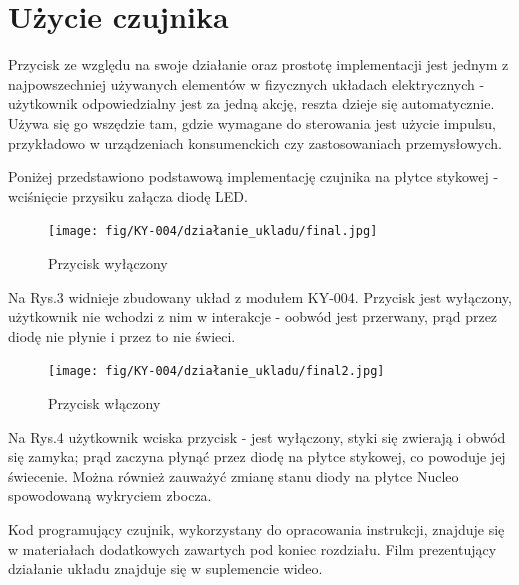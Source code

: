 \documentclass[11pt, a4paper]{article}
\begin{document}
\section*{Użycie czujnika}
Przycisk ze względu na swoje działanie oraz prostotę implementacji jest jednym z najpowszechniej używanych elementów w fizycznych układach elektrycznych - użytkownik odpowiedzialny jest za jedną akcję, reszta dzieje się automatycznie. Używa się go wszędzie tam, gdzie wymagane do sterowania jest użycie impulsu, przykładowo w urządzeniach konsumenckich czy zastosowaniach przemysłowych.


Poniżej przedstawiono podstawową implementację czujnika na płytce stykowej - wciśnięcie przysiku załącza diodę LED.

\vspace{0.5cm}
\begin{figure}[h!]
    \centering
    \texttt{[image: fig/KY-004/działanie\_ukladu/final.jpg]}
    \caption{Przycisk wyłączony}
    \label{fig:my_label}
\end{figure}

Na Rys.3 widnieje zbudowany układ z modułem KY-004. Przycisk jest wyłączony, użytkownik nie wchodzi z nim w interakcje - oobwód jest przerwany, prąd przez diodę nie płynie i przez to nie świeci.

\vspace{0.5cm}

\begin{figure}[h!]
    \centering
    \texttt{[image: fig/KY-004/działanie\_ukladu/final2.jpg]}
    \caption{Przycisk włączony}
    \label{fig:my_label}
\end{figure}

Na Rys.4 użytkownik wciska przycisk - jest wyłączony, styki się zwierają i obwód się zamyka; prąd zaczyna płynąć przez diodę na płytce stykowej, co powoduje jej świecenie. Można również zauważyć zmianę stanu diody na płytce Nucleo spowodowaną wykryciem zbocza. 
\newline 



Kod programujący czujnik, wykorzystany do opracowania instrukcji, znajduje się w materiałach dodatkowych zawartych pod koniec rozdziału.
\newline
Film prezentujący działanie układu znajduje się w suplemencie wideo.
\printbibliography[heading=bibintoc]
\end{document}
